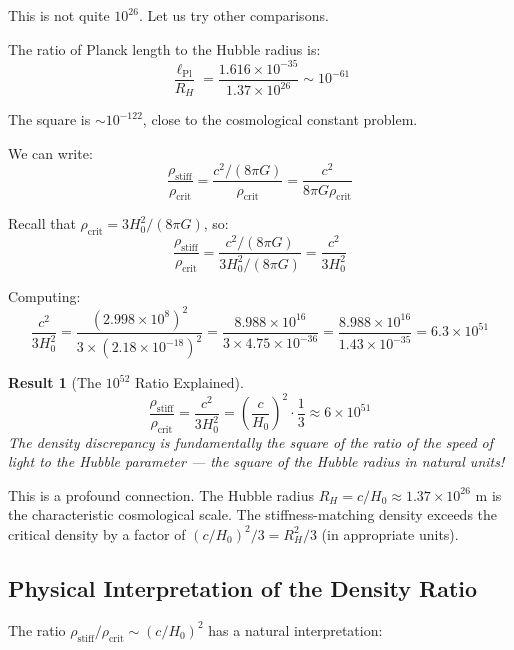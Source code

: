 \documentclass[11pt,a4paper]{article}
\newcommand{\ee}[1]{\times 10^{#1}}
\newcommand{\lPl}{\ensuremath{\ell_{\mathrm{Pl}}}}
\newcommand{\rhocrit}{\ensuremath{\rho_{\mathrm{crit}}}}
\newcommand{\rhostiff}{\ensuremath{\rho_{\mathrm{stiff}}}}
\newtheorem{result}{Result}
\theoremstyle{definition}
\begin{document}
This is not quite $10^{26}$. Let us try other comparisons.

The ratio of Planck length to the Hubble radius is:
\begin{equation}
\frac{\lPl}{R_H} = \frac{1.616 \ee{-35}}{1.37 \ee{26}} \sim 10^{-61}
\end{equation}

The square is $\sim 10^{-122}$, close to the cosmological constant problem.

We can write:
\begin{equation}
\frac{\rhostiff}{\rhocrit} = \frac{c^2/(8\pi G)}{\rhocrit} = \frac{c^2}{8\pi G \rhocrit}
\end{equation}

Recall that $\rhocrit = 3H_0^2/(8\pi G)$, so:
\begin{equation}
\frac{\rhostiff}{\rhocrit} = \frac{c^2/(8\pi G)}{3H_0^2/(8\pi G)} = \frac{c^2}{3H_0^2}
\end{equation}

Computing:
\begin{equation}
\frac{c^2}{3H_0^2} = \frac{(2.998 \ee{8})^2}{3 \times (2.18 \ee{-18})^2} = \frac{8.988 \ee{16}}{3 \times 4.75 \ee{-36}} = \frac{8.988 \ee{16}}{1.43 \ee{-35}} = 6.3 \ee{51}
\end{equation}

\begin{result}[The $10^{52}$ Ratio Explained]
\begin{equation}
\boxed{\frac{\rhostiff}{\rhocrit} = \frac{c^2}{3H_0^2} = \left(\frac{c}{H_0}\right)^2 \cdot \frac{1}{3} \approx 6 \times 10^{51}}
\end{equation}
The density discrepancy is fundamentally the square of the ratio of the speed of light to the Hubble parameter --- the square of the Hubble radius in natural units!
\end{result}

This is a profound connection. The Hubble radius $R_H = c/H_0 \approx 1.37 \ee{26}$ m is the characteristic cosmological scale. The stiffness-matching density exceeds the critical density by a factor of $(c/H_0)^2/3 = R_H^2/3$ (in appropriate units).

\subsection{Physical Interpretation of the Density Ratio}
\label{sec:interpretation}

The ratio $\rhostiff/\rhocrit \sim (c/H_0)^2$ has a natural interpretation:
\end{document}
